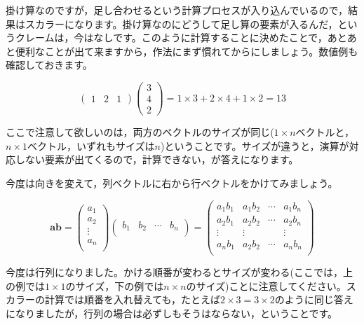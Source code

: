 \documentclass{ltjsbook}
\begin{document}
掛け算なのですが，足し合わせるという計算プロセスが入り込んでいるので，結果はスカラーになります。掛け算なのにどうして足し算の要素が入るんだ，というクレームは，今はなしです。このように計算することに決めたことで，あとあと便利なことが出て来ますから，作法にまず慣れてからにしましょう。数値例も確認しておきます。

\begin{equation*}
    \begin{pmatrix}
        1 & 2 & 1
    \end{pmatrix}
    \begin{pmatrix}
        3 \\4\\2
    \end{pmatrix}
    =1\times 3 + 2 \times 4 + 1 \times 2 = 13
\end{equation*}

ここで注意して欲しいのは，両方のベクトルのサイズが同じ($1\times n$ベクトルと，$n \times 1$ベクトル，いずれもサイズは$n$)ということです。サイズが違うと，演算が対応しない要素が出てくるので，計算できない，が答えになります。

今度は向きを変えて，列ベクトルに右から行ベクトルをかけてみましょう。

\begin{equation*}
    \bm{a} \bm{b} =
    \begin{pmatrix}
        a_1    \\
        a_2    \\
        \vdots \\
        a_n    \\
    \end{pmatrix}
    \begin{pmatrix}
        b_1 & b_2 & \cdots & b_n \\
    \end{pmatrix}
    =
    \begin{pmatrix}
        a_1 b_1 & a_1 b_2 & \cdots & a_1 b_n \\
        a_2 b_1 & a_2 b_2 & \cdots & a_2 b_n \\
        \vdots  & \vdots  &        & \vdots  \\
        a_n b_1 & a_2 b_2 & \cdots & a_n b_n \\
    \end{pmatrix}
\end{equation*}


今度は行列になりました。かける順番が変わるとサイズが変わる(ここでは，上の例では$1\times 1$のサイズ，下の例では$n \times n$のサイズ)ことに注意してください。スカラーの計算では順番を入れ替えても，たとえば$2 \times 3=3\times 2$のように同じ答えになりましたが，行列の場合は必ずしもそうはならない，ということです。
\end{document}

